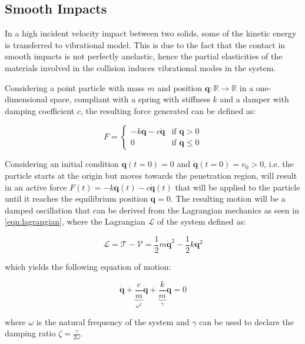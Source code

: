 \subsection{Smooth Impacts}

In a high incident velocity impact between two solids, some of the kinetic energy is transferred to vibrational model. This is due to the fact that the contact in smooth impacts is not perfectly anelastic, hence the partial elasticities of the materials involved in the collision induces vibrational modes in the system.

Considering a point particle with mass $m$ and position $\mathbf{q} : \mathbb{R} \rightarrow \mathbb{R}$ in a one-dimensional space, compliant with a spring with stiffness $k$ and a damper with damping coefficient $c$, the resulting force generated can be defined as:

\begin{equation}
    F = \begin{cases}
        -k\mathbf{q} - c\dot{\mathbf{q}} & \text{if } \mathbf{q} > 0    \\
        0                                & \text{if } \mathbf{q} \leq 0
    \end{cases}
\end{equation}

Considering an initial condition $\mathbf{q}(t=0) = 0$ and $\dot{\mathbf{q}}(t=0) = v_0 > 0$, i.e. the particle starts at the origin but moves towards the penetration region, will result in an active force $F(t) = -k\mathbf{q}(t) - c\dot{\mathbf{q}}(t)$ that will be applied to the particle until it reaches the equilibrium position $\mathbf{q} = 0$. The resulting motion will be a damped oscillation that can be derived from the Lagrangian mechanics as seen in \cref{eqn:lagrangian}, where the Lagrangian $\mathcal{L}$ of the system defined as:

\begin{equation}
    \mathcal{L} = \mathcal{T} - \mathcal{V} = \frac{1}{2}m\dot{\mathbf{q}}^2 - \frac{1}{2}k\mathbf{q}^2
\end{equation}

which yields the following equation of motion:

\begin{equation}
    \ddot{\mathbf{q}} + \underbrace{\frac{c}{m}} _{\omega ^2} \dot{\mathbf{q}} + \underbrace{\frac{k}{m}} _\gamma \mathbf{q} = 0
\end{equation}

where $\omega$ is the natural frequency of the system and $\gamma$ can be used to declare the damping ratio $\zeta = \frac{\gamma}{2\omega}$.

